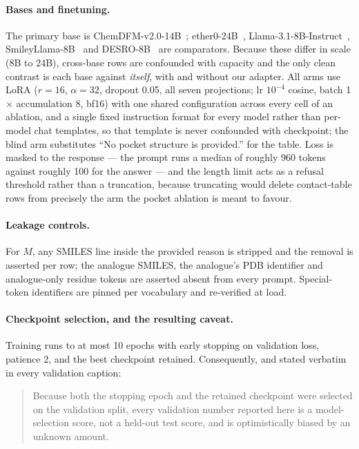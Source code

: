 \paragraph{Bases and finetuning.} The primary base is ChemDFM-v2.0-14B~\citep{zhao2024chemdfm};
ether0-24B~\citep{narayanan2025ether0}, Llama-3.1-8B-Instruct~\citep{dubey2024llama3},
SmileyLlama-8B~\citep{cavanagh2024smileyllama} and DESRO-8B~\citep{liu2026desro} are comparators.
Because these differ in scale (8B to 24B), cross-base rows are confounded with capacity and the only
clean contrast is each base against \emph{itself}, with and without our adapter. All arms use LoRA
($r{=}16$, $\alpha{=}32$, dropout 0.05, all seven projections; lr $10^{-4}$ cosine, batch 1 $\times$
accumulation 8, bf16) with one shared configuration across every cell of an ablation, and a single
fixed instruction format for every model rather than per-model chat templates, so that template is
never confounded with checkpoint; the blind arm substitutes ``No pocket structure is provided.'' for
the table. Loss is masked to the response --- the prompt runs a median of roughly 960 tokens against
roughly 100 for the answer --- and the length limit acts as a refusal threshold rather than a
truncation, because truncating would delete contact-table rows from precisely the arm the pocket
ablation is meant to favour.

\paragraph{Leakage controls.} For $M$, any SMILES line inside the provided reason is stripped and
the removal is asserted per row; the analogue SMILES, the analogue's PDB identifier and
analogue-only residue tokens are asserted absent from every prompt. Special-token identifiers are
pinned per vocabulary and re-verified at load.

\paragraph{Checkpoint selection, and the resulting caveat.} Training runs to at most 10 epochs with
early stopping on validation loss, patience 2, and the best checkpoint retained. Consequently, and
stated verbatim in every validation caption:

\begin{quote}
Because both the stopping epoch and the retained checkpoint were selected on the validation split,
every validation number reported here is a model-selection score, not a held-out test score, and is
optimistically biased by an unknown amount.
\end{quote}

